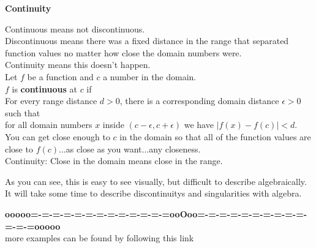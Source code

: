 \documentclass{ximera}
\begin{document}
\begin{idea} \textbf{Continuity}


Continuous means not discontinuous. \\

Discontinuous means there was a fixed distance in the range that separated function values no matter how close the domain numbers were. \\

Continuity means this doesn't happen. \\


Let $f$ be a function and $c$ a number in the domain. \\

$f$ is \textbf{continuous} at $c$ if  \\


For every range distance $d > 0 $, there is a corresponding domain distance $\epsilon > 0$ such that \\


for all domain numbers $x$ inside $(c - \epsilon, c + \epsilon)$ we have $| f(x) - f(c) | < d$. \\


You can get close enough to $c$ in the domain so that all of the function values are close to $f(c)$...as close as you want...any closeness. \\



Continuity: Close in the domain means close in the range.


\end{idea}


As you can see, this is easy to see visually, but difficult to describe algebraically.  It will take some time to describe discontinuitys and singularities with algebra.











\begin{center}
\textbf{\textcolor{green!50!black}{ooooo=-=-=-=-=-=-=-=-=-=-=-=-=ooOoo=-=-=-=-=-=-=-=-=-=-=-=-=ooooo}} \\

more examples can be found by following this link\\ 

\end{center}
\end{document}
